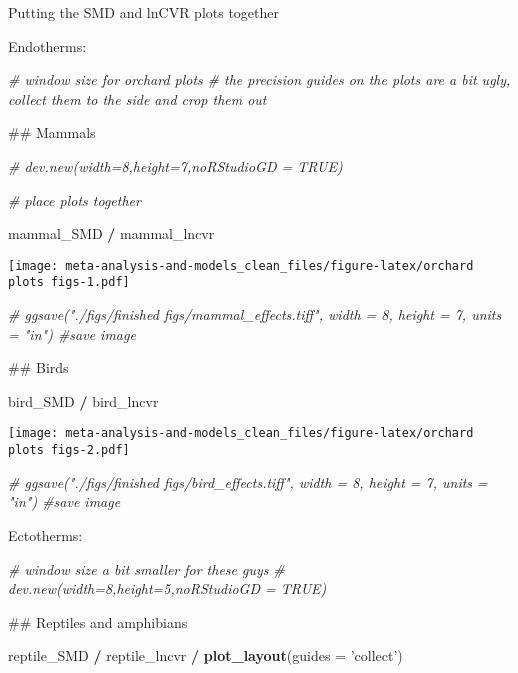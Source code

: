 \documentclass[]{article}
\newenvironment{Shaded}{\begin{snugshade}}{\end{snugshade}}
\newcommand{\KeywordTok}[1]{\textcolor[rgb]{0.13,0.29,0.53}{\textbf{#1}}}
\newcommand{\DataTypeTok}[1]{\textcolor[rgb]{0.13,0.29,0.53}{#1}}
\newcommand{\StringTok}[1]{\textcolor[rgb]{0.31,0.60,0.02}{#1}}
\newcommand{\CommentTok}[1]{\textcolor[rgb]{0.56,0.35,0.01}{\textit{#1}}}
\newcommand{\OperatorTok}[1]{\textcolor[rgb]{0.81,0.36,0.00}{\textbf{#1}}}
\newcommand{\NormalTok}[1]{#1}
\begin{document}
Putting the SMD and lnCVR plots together

Endotherms:

\begin{Shaded}
\begin{Highlighting}[]
  \CommentTok{# window size for orchard plots}
  \CommentTok{# the precision guides on the plots are a bit ugly, collect them to the side and crop them out   }
  
\NormalTok{## Mammals}
 
  \CommentTok{# dev.new(width=8,height=7,noRStudioGD = TRUE)}

\CommentTok{# place plots together}

\NormalTok{mammal_SMD }\OperatorTok{/}\StringTok{ }\NormalTok{mammal_lncvr }
\end{Highlighting}
\end{Shaded}

\texttt{[image: meta-analysis-and-models\_clean\_files/figure-latex/orchard plots figs-1.pdf]}

\begin{Shaded}
\begin{Highlighting}[]
\CommentTok{# ggsave("./figs/finished figs/mammal_effects.tiff", width = 8, height = 7, units = "in") #save image}

\NormalTok{## Birds}

\NormalTok{bird_SMD }\OperatorTok{/}\StringTok{ }\NormalTok{bird_lncvr}
\end{Highlighting}
\end{Shaded}

\texttt{[image: meta-analysis-and-models\_clean\_files/figure-latex/orchard plots figs-2.pdf]}

\begin{Shaded}
\begin{Highlighting}[]
\CommentTok{# ggsave("./figs/finished figs/bird_effects.tiff", width = 8, height = 7, units = "in") #save image}
\end{Highlighting}
\end{Shaded}

Ectotherms:

\begin{Shaded}
\begin{Highlighting}[]
\CommentTok{# window size a bit smaller for these guys}
    \CommentTok{# dev.new(width=8,height=5,noRStudioGD = TRUE)}

\NormalTok{## Reptiles and amphibians}

\NormalTok{reptile_SMD }\OperatorTok{/}\StringTok{ }\NormalTok{reptile_lncvr }\OperatorTok{/}\StringTok{ }\KeywordTok{plot_layout}\NormalTok{(}\DataTypeTok{guides =} \StringTok{'collect'}\NormalTok{)}
\end{Highlighting}
\end{Shaded}
\end{document}
